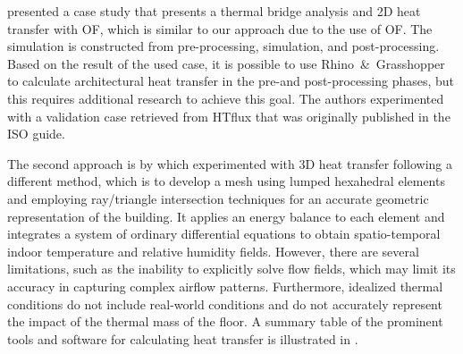 \documentclass[runningheads]{llncs}
\begin{document}
\citeauthor{kastner2020solving} \cite{kastner2020solving} presented a case study that presents a thermal bridge analysis and 2D heat transfer with OF, which is similar to our approach due to the use of OF. The simulation is constructed from pre-processing, simulation, and post-processing. 
Based on the result of the used case, it is possible to use Rhino\ \&\ Grasshopper to calculate architectural heat transfer in the pre-and post-processing phases, but this requires additional research to achieve this goal. 
The authors experimented with a validation case retrieved from HTflux that was originally published in the ISO guide. 

The second approach is by \citeauthor{Yang} \cite{Yang} which experimented with 3D heat transfer following a different method, which is to develop a mesh using lumped hexahedral elements and employing ray/triangle intersection techniques for an accurate geometric representation of the building. 
It applies an energy balance to each element and integrates a system of ordinary differential equations to obtain spatio-temporal indoor temperature and relative humidity fields. 
However, there are several limitations, such as the inability to explicitly solve flow fields, which may limit its accuracy in capturing complex airflow patterns. 
Furthermore, idealized thermal conditions do not include real-world conditions and do not accurately represent the impact of the thermal mass of the floor. A summary table of the prominent tools and software for calculating heat transfer is illustrated in .
\end{document}
